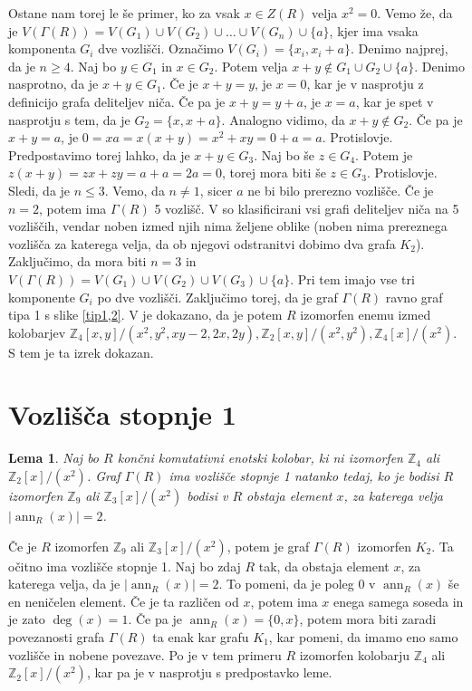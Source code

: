 \documentclass[a4paper, 12pt]{amsart}
\theoremstyle{definition} %
\theoremstyle{plain} %
\newtheorem{lema}[definicija]{Lema}
\newcommand{\Z}{\mathbb Z}
\DeclareMathOperator{\ann}{ann}
\begin{document}
Ostane nam torej le še primer, ko za vsak $x\in Z(R)$ velja $x^2 = 0$. Vemo že, da je $V(\Gamma(R)) = V(G_1) \cup V(G_2) \cup \dots \cup V(G_n) \cup \{a\}$, kjer ima vsaka komponenta $G_i$ dve vozlišči. Označimo $V(G_i) = \{x_i,x_i +a  \}$. Denimo najprej, da je $n\ge 4$. Naj bo $y\in G_1$ in $ x\in G_2$. Potem velja $x+y\notin G_1 \cup G_2 \cup \{a\}$. Denimo nasprotno, da je $x+y \in G_1$. Če je $x+y  = y$, je $x=0$, kar je v nasprotju z definicijo grafa deliteljev niča. Če pa je $x+y = y+a$, je $x=a$, kar je spet v nasprotju s tem, da je $G_2 = \{x,x+a\}$. Analogno vidimo, da $x+y\notin G_2$. Če pa je $x+y=a$, je $0 = xa = x(x+y) = x^2 + xy = 0+a = a$. Protislovje. Predpostavimo torej lahko, da je $x+y\in G_3$. Naj bo še $z\in G_4$. Potem je $z(x+y) = zx + zy = a +a = 2a = 0$, torej mora biti še $z\in G_3$. Protislovje. Sledi, da je $n\le 3$. Vemo, da $n\neq 1$, sicer $a$ ne bi bilo prerezno vozlišče. Če je $n=2$, potem ima $\Gamma(R)$ 5 vozlišč. V \cite{Redmond} so klasificirani vsi grafi deliteljev niča na 5 vozliščih, vendar noben izmed njih nima željene oblike (noben nima prereznega vozlišča za katerega velja, da ob njegovi odstranitvi dobimo dva grafa $K_2$). Zaključimo, da mora biti $n=  3$ in $V( \Gamma(R)) = V(G_1) \cup V(G_2) \cup V(G_3) \cup \{a\}$. Pri tem imajo vse tri komponente $G_i$ po dve vozlišči. Zaključimo torej, da je graf $\Gamma(R)$ ravno graf tipa 1 s slike \ref{tip1,2}. V \cite{Redmond} je dokazano, da je potem $R$ izomorfen enemu izmed kolobarjev $\Z_4[x,y]/(x^2,y^2,xy-2,2x,2y), \Z_2[x,y]/(x^2,y^2),\Z_4[x]/(x^2)$. S tem je ta izrek dokazan.


\endproof

\section{Vozlišča stopnje 1}

\begin{lema}
\label{vertexOfDegree1}
Naj bo $R$ končni komutativni enotski kolobar, ki ni izomorfen $\Z_4$ ali $\Z_2[x]/(x^2)$. Graf $\Gamma(R)$ ima vozlišče stopnje 1 natanko tedaj, ko je bodisi $R$ izomorfen $\Z_9$ ali $\Z_3[x]/(x^2)$ bodisi v $R$ obstaja element $x$, za katerega velja $|\ann_R(x) | = 2$.
\end{lema}

\proof
Če je $R$ izomorfen $\Z_9$ ali $\Z_3[x]/(x^2)$, potem je graf $\Gamma(R)$ izomorfen $K_2$. Ta očitno ima vozlišče stopnje 1. Naj bo zdaj $R$ tak, da obstaja element $x$, za katerega velja, da je $|\ann_R(x)| = 2$. To pomeni, da je poleg 0 v $\ann_R(x)$ še en neničelen element. Če je ta različen od $x$, potem ima $x$ enega samega soseda in je zato  $\deg(x) = 1$. Če pa je $\ann_R(x) = \{0,x\}$, potem mora biti zaradi povezanosti grafa $\Gamma(R)$ ta enak kar grafu $K_1$, kar pomeni, da imamo eno samo vozlišče in nobene povezave. Po \cite{Anderson-klasifikacijaMalihGrafov} je v tem primeru $R$ izomorfen kolobarju $\Z_4$ ali $\Z_2[x]/(x^2)$, kar pa je v nasprotju s predpostavko leme.
\end{document}
